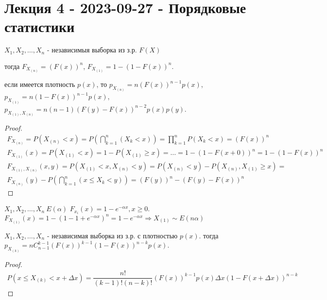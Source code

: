 \chapter{Лекция 4 - 2023-09-27 - Порядковые статистики}

\begin{theorem}
  $X_1, X_2, \dots, X_n$ - независимыя выборка из з.р. $F(X)$

  тогда $F_{X_{(n)}} = (F(x))^n$, $F_{X_{(1)}} = 1 - (1-F(x))^n$.

  если имеется плотность $p(x)$, то $p_{X_{(n)}} = n (F(x))^{n-1} p(x)$, $p_{X_{(1)}} = n (1-F(x))^{n-1} p(x)$, $p_{X_{(1)}, X_{(n)}} = n (n-1) (F(y) - F(x))^{n-2} p(x) p(y)$.
\end{theorem}

\begin{proof}
  \begin{multline}
    F_{X_{(n)}} = P(X_{(n)} < x) = P\left(\bigcap_{k=1}^n (X_k < x)\right) = \prod_{k=1}^n P(X_k < x) = (F(x))^n\\
    F_{X_{(1)}} (x) = P(X_{(1)} < x) = 1 - P(X_{(1)} \geqslant x) = \dots = 1 - (1-F(x+0))^n = 1 - (1-F(x))^n \\
    F_{X_{(1)}, X_{(n)}} (x, y) = P(X_{(1)} < x, X_{(n)} < y) = P(X_{(n)} < y) - P(X_{(n)}, X_{(1)} \geqslant x) = \\
    F_{X_{(n)}} (y) - P(\bigcap_{k=1}^n (x \leqslant X_k < y)) = (F(y))^n - (F(y) - F(x))^n
  \end{multline}
\end{proof}

\begin{ex}
  $X_1, X_2, \dots, X_n ~ E(\alpha)$
  $F_{x_i} (x) = 1- e^{-\alpha x}, x\geqslant 0.$
  $F_{X_{(1)}} (x) = 1 - (1-1+e^{-\alpha x})^n = 1 - e^{-\alpha x} \Rightarrow X_{(1)} \sim E(n\alpha)$
\end{ex}

\begin{theorem}
  $X_1, X_2, \dots, X_n$ - независимая выборка из з.р. с плотностью $p(x)$.
  тогда $p_{X_{(k)}} = n C_{n-1}^{k-1} (F(x))^{k-1} (1-F(x))^{n-k} p(x)$.
\end{theorem}

\begin{proof}
  \begin{multline*}
    P(x\leqslant X_{(k)} < x+\Delta x) = \dfrac{n!}{(k-1)! (n-k)!} (F(x))^{k-1} p(x) \Delta x (1-F(x+\Delta x))^{n-k}
  \end{multline*}
\end{proof}

